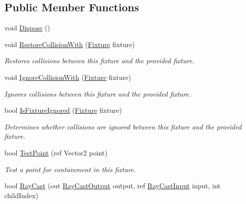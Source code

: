 \subsection*{Public Member Functions}
\begin{DoxyCompactItemize}
\item 
void \hyperlink{class_farseer_physics_1_1_dynamics_1_1_fixture_a503ddd7c6db63912b44d88579d8a48a3}{Dispose} ()
\item 
void \hyperlink{class_farseer_physics_1_1_dynamics_1_1_fixture_a002c1d3988267e9edfcd28fb16a0901d}{Restore\+Collision\+With} (\hyperlink{class_farseer_physics_1_1_dynamics_1_1_fixture}{Fixture} fixture)
\begin{DoxyCompactList}\small\item\em Restores collisions between this fixture and the provided fixture. \end{DoxyCompactList}\item 
void \hyperlink{class_farseer_physics_1_1_dynamics_1_1_fixture_a6c80e0b2b9f2490172b1adbe6a8cd706}{Ignore\+Collision\+With} (\hyperlink{class_farseer_physics_1_1_dynamics_1_1_fixture}{Fixture} fixture)
\begin{DoxyCompactList}\small\item\em Ignores collisions between this fixture and the provided fixture. \end{DoxyCompactList}\item 
bool \hyperlink{class_farseer_physics_1_1_dynamics_1_1_fixture_a1be2685f96f188f5d15ecfe7541c2aef}{Is\+Fixture\+Ignored} (\hyperlink{class_farseer_physics_1_1_dynamics_1_1_fixture}{Fixture} fixture)
\begin{DoxyCompactList}\small\item\em Determines whether collisions are ignored between this fixture and the provided fixture. \end{DoxyCompactList}\item 
bool \hyperlink{class_farseer_physics_1_1_dynamics_1_1_fixture_ad4456263506cbb3f4b9acd5361b6e3f8}{Test\+Point} (ref Vector2 point)
\begin{DoxyCompactList}\small\item\em Test a point for containment in this fixture. \end{DoxyCompactList}\item 
bool \hyperlink{class_farseer_physics_1_1_dynamics_1_1_fixture_a55ee279289716f535d88fcf27a686d02}{Ray\+Cast} (out \hyperlink{struct_farseer_physics_1_1_collision_1_1_ray_cast_output}{Ray\+Cast\+Output} output, ref \hyperlink{struct_farseer_physics_1_1_collision_1_1_ray_cast_input}{Ray\+Cast\+Input} input, int child\+Index)

\end{DoxyCompactItemize}
